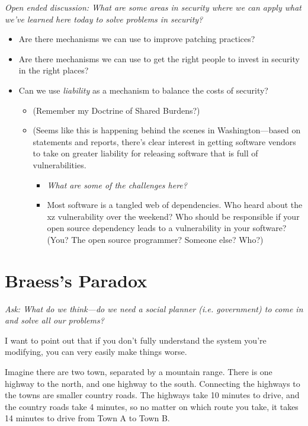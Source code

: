 \documentclass[11pt]{article}
\begin{document}
{\it Open ended discussion: What are some areas in security where we can apply what we've learned here today to solve problems in security?}
\begin{itemize}
    \item Are there mechanisms we can use to improve patching practices?
    \item Are there mechanisms we can use to get the right people to invest in security in the right places?
    \item Can we use {\it liability} as a mechanism to balance the costs of security?
    \begin{itemize}
        \item (Remember my Doctrine of Shared Burdens?)
        \item (Seems like this is happening behind the scenes in Washington---based on statements and reports, there's clear interest in getting software vendors to take on greater liability for releasing software that is full of vulnerabilities. 
        \begin{itemize}
            \item {\it What are some of the challenges here?}
            \item Most software is a tangled web of dependencies. Who heard about the xz vulnerability over the weekend? Who should be responsible if your open source dependency leads to a vulnerability in your software? (You? The open source programmer? Someone else? Who?)
        \end{itemize}
    \end{itemize}
\end{itemize}


\section{Braess's Paradox}

{\it Ask: What do we think---do we need a social planner (i.e. government) to come in and solve all our problems?}

I want to point out that if you don't fully understand the system you're modifying, you can very easily make things worse. 

Imagine there are two town, separated by a mountain range. There is one highway to the north, and one highway to the south. 
Connecting the highways to the towns are smaller country roads.  
The highways take 10 minutes to drive, and the country roads take 4 minutes, so no matter on which route you take, it takes 14 minutes to drive from Town A to Town B.
\end{document}
